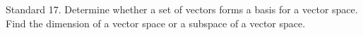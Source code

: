 Standard 17.	Determine whether a set of vectors forms a basis for a vector space. Find the dimension of a vector space or a subspace of a vector space.


\ifprintanswers
\else %
 \newpage
\fi

\begin{solution}
   
\end{solution}